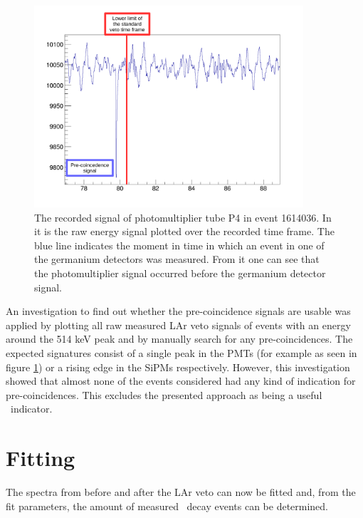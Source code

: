 \documentclass[encoding=utf8,british]{tumphthesis}
\begin{document}
\begin{figure}[t!]
	\centering
	\ifmakefigures%
	\includegraphics[width=100mm]{./Bilder/BeispielSignal.pdf}
	\fi%

	\caption{
    The recorded signal of photomultiplier tube P4 in event 1614036. 
    In it is the raw energy signal plotted over the recorded time frame. 
    The blue line indicates the moment in time in which an event in one of the germanium detectors was measured. 
    From it one can see that the photomultiplier signal occurred before the germanium detector signal.   
    }
    	\label{fig:BeispielSignal}
\end{figure}


An investigation to find out whether the pre-coincidence signals are usable was applied by plotting all raw measured LAr veto signals of events with an energy around the 514 keV peak and by manually search for any pre-coincidences.
The expected signatures consist of a single peak in the PMTs (for example as seen in figure \ref{fig:BeispielSignal}) or a rising edge in the SiPMs respectively.
However, this investigation showed that almost none of the events considered had any kind of indication for pre-coincidences.
This excludes the presented approach as being a useful \Kr\ indicator.

\section{Fitting}
\label{sec:Fitting}

The spectra from before and after the LAr veto can now be fitted and, from the fit parameters, the amount of measured \Kr\ decay events can be determined.
\\
\end{document}
